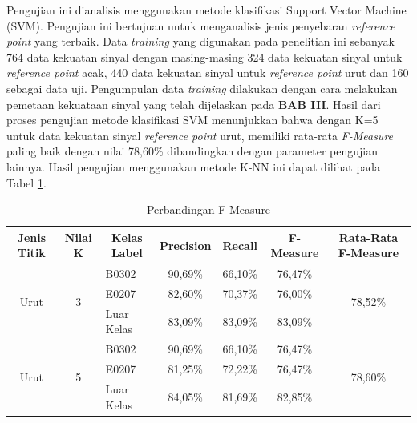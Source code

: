 \begin{enumerate}[a.]
\begin{enumerate}[a.]
\begin{enumerate}
	      \par Pengujian ini dianalisis menggunakan metode klasifikasi Support Vector Machine (SVM). Pengujian ini bertujuan untuk menganalisis jenis penyebaran \textit{reference point} yang terbaik. Data \textit{training} yang digunakan pada penelitian ini sebanyak 764 data kekuatan sinyal dengan masing-masing 324 data kekuatan  sinyal untuk \textit{reference point} acak, 440 data kekuatan sinyal untuk \textit{reference point} urut dan 160 sebagai data uji. Pengumpulan data \textit{training} dilakukan dengan cara melakukan pemetaan kekuataan sinyal yang telah dijelaskan pada \textbf{BAB III}. Hasil dari proses pengujian metode klasifikasi SVM menunjukkan bahwa dengan K=5 untuk data kekuatan sinyal \textit{reference point} urut, memiliki rata-rata \textit{F-Measure} paling baik dengan nilai 78,60\% dibandingkan dengan parameter pengujian lainnya. Hasil pengujian menggunakan metode K-NN ini  dapat dilihat pada Tabel \ref{tabelfmeasure9}.
	      \begin{table}[H]
		      \fontsize{9}{12}\selectfont
		      \center
		      \caption{Perbandingan F-Measure}
		      \label{tabelfmeasure9}
		      \begin{tabular}{|c|c|l|c|c|c|c|}
			      \hline
			      Jenis Titik           & Nilai K            & \multicolumn{1}{c|}{Kelas Label} & Precision & Recall  & F-Measure & Rata-Rata F-Measure      \\ \hline
			      \multirow{3}{*}{Urut} & \multirow{3}{*}{3} & B0302                            & 90,69\%   & 66,10\% & 76,47\%   & \multirow{3}{*}{78,52\%} \\ \cline{3-6}
			                            &                    & E0207                            & 82,60\%   & 70,37\% & 76,00\%   &                          \\ \cline{3-6}
			                            &                    & Luar Kelas                       & 83,09\%   & 83,09\% & 83,09\%   &                          \\ \hline
			      \multirow{3}{*}{Urut} & \multirow{3}{*}{5} & B0302                            & 90,69\%   & 66,10\% & 76,47\%   & \multirow{3}{*}{78,60\%} \\ \cline{3-6}
			                            &                    & E0207                            & 81,25\%   & 72,22\% & 76,47\%   &                          \\ \cline{3-6}
			                            &                    & Luar Kelas                       & 84,05\%   & 81,69\% & 82,85\%   &                          \\ \hline

\end{tabular}
\end{table}
\end{enumerate}
\end{enumerate}
\end{enumerate}
